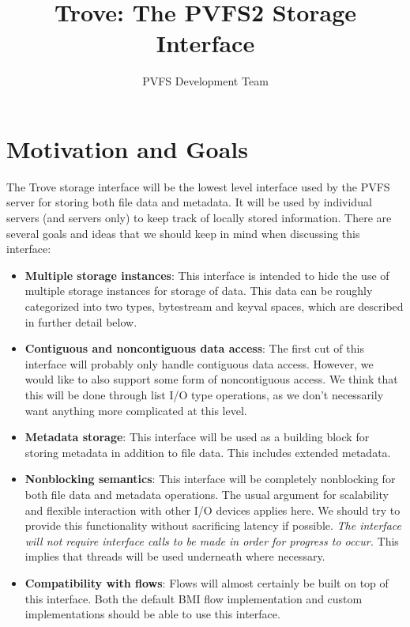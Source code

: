 \documentclass[10pt]{article} %
\title{Trove: The PVFS2 Storage Interface}
\author{PVFS Development Team}
\begin{document}
\maketitle

\section{Motivation and Goals}

The Trove storage interface will be the lowest level interface used by the
PVFS server for storing both file data and metadata.  It will be used by
individual servers (and servers only) to keep track of locally stored
information.  There are several goals and ideas that we should keep in
mind when discussing this interface:

\begin{itemize}
\item \textbf{Multiple storage instances}: This interface is intended to
hide the use of multiple storage instances for storage of data.  This
data can be roughly categorized into two types, bytestream and keyval
spaces, which are described in further detail below.

\item \textbf{Contiguous and noncontiguous data access}:  The first cut
of this interface will probably only handle contiguous data access.
However, we would like to also support some form of noncontiguous access.  We
think that this will be done through list I/O type operations, as we don't
necessarily want anything more complicated at this level.

\item \textbf{Metadata storage}:  This
interface will be used as a building block for storing metadata in 
addition to file data.  This includes extended metadata.

\item \textbf{Nonblocking semantics}:  This interface will be completely
nonblocking for both file data and metadata operations.  The usual
argument for scalability and flexible interaction with other I/O
devices applies here.  We should try to provide this
functionality without sacrificing latency if possible.
\emph{The interface will not require interface calls to be made in order
for progress to occur.}  This implies that threads will be used
underneath where necessary.

\item \textbf{Compatibility with flows}:  Flows will almost certainly be
built on top of this interface.  Both the default BMI flow
implementation and custom implementations should be able to use this
interface.


\end{itemize}
\end{document}
